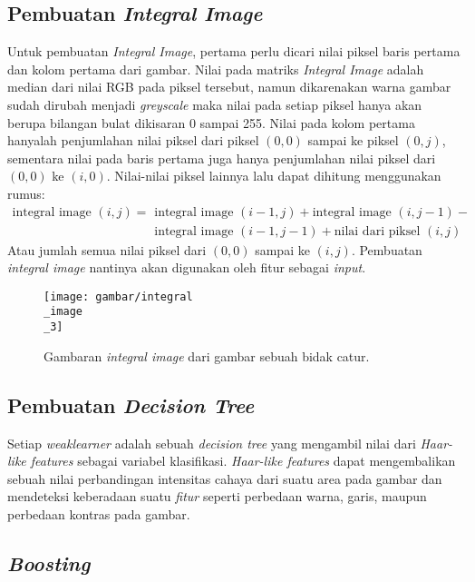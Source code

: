 \subsection{Pembuatan \textit{Integral Image}}

Untuk pembuatan \emph{Integral Image}, pertama perlu dicari nilai piksel
baris pertama dan kolom pertama dari gambar. Nilai pada matriks \emph{Integral Image} 
adalah median dari nilai RGB pada piksel tersebut, namun dikarenakan warna 
gambar sudah dirubah menjadi \emph{greyscale} maka nilai pada setiap piksel 
hanya akan berupa bilangan bulat dikisaran 0 sampai 255. Nilai pada kolom 
pertama hanyalah penjumlahan nilai piksel dari piksel $(0, 0)$ sampai ke piksel 
$(0, j)$, sementara nilai pada baris pertama juga hanya penjumlahan nilai 
piksel dari $(0, 0)$ ke  $(i, 0)$. Nilai-nilai piksel lainnya lalu dapat 
dihitung menggunakan rumus: 
\begin{equation}
  \begin{split}
    \text{integral image } (i,j) = {} & \text{integral image } (i-1,j) + \text{integral image } (i,j-1) - \\
    & \text{integral image } (i-1,j-1) + \text{nilai dari piksel } (i,j)
  \end{split}
\end{equation}
Atau jumlah semua nilai piksel dari $(0, 0)$ sampai ke $(i, j)$.
Pembuatan \emph{integral image} nantinya akan digunakan oleh fitur sebagai \textit{input}.

\begin{figure}[H]
  \centering{}
	\texttt{[image: gambar/integral\\\_image\\\_3]}
  \caption{Gambaran \emph{integral image} dari gambar sebuah bidak catur.}
\end{figure}

\subsection{Pembuatan \textit{Decision Tree}}

Setiap \emph{weaklearner} adalah sebuah \emph{decision tree} yang mengambil nilai 
dari \emph{Haar-like features} sebagai variabel klasifikasi.
\emph{Haar-like features} dapat mengembalikan 
sebuah nilai perbandingan intensitas cahaya dari suatu area pada gambar dan 
mendeteksi keberadaan suatu \emph{fitur} seperti 
perbedaan warna, garis, maupun perbedaan kontras pada gambar. 

\subsection{\emph{Boosting}}

